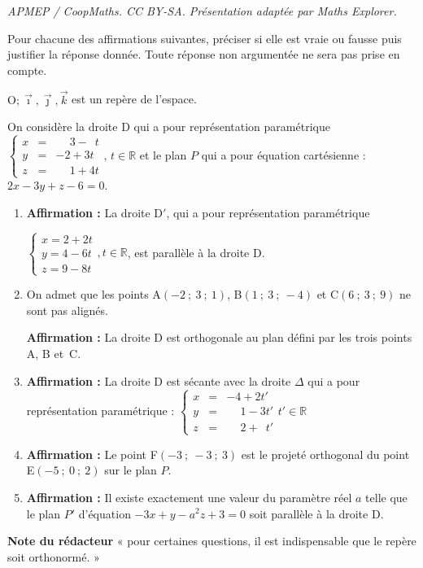 \documentclass[10pt]{article}
\providecommand{\R}{\mathbb{R}}
\providecommand{\Oijk}{\(\mathrm{O};\vec{\imath},\vec{\jmath},\vec{k}\)}
\begin{document}
\noindent\textit{APMEP / CoopMaths. CC BY-SA. Présentation adaptée par Maths Explorer.}\par\medskip
\medskip

Pour chacune des affirmations suivantes, préciser si elle est vraie ou fausse puis justifier la réponse donnée. Toute réponse non argumentée ne sera pas prise en compte.

\bigskip
\Oijk{} est un repère de l'espace.

On considère la droite D qui a pour représentation paramétrique $\left\{\begin{array}{lcl}x&=&\phantom{-}3 - \phantom{3}t \\ y&=&-2 + 3t \\ z&=&\phantom{-}1 + 4t\end{array},\, t \in \R\right.$ et le plan $P$ qui a pour équation cartésienne : $2x -3y + z - 6 = 0$.

\medskip

\begin{enumerate}
\item \textbf{Affirmation :} 
La droite $\mathrm{D}'$, qui a pour représentation paramétrique 

$\left\{\begin{array}{l}x=2+2 t \\ y=4-6 t \\ z=9-8 t\end{array}, t \in \R\right.$, est parallèle à la droite D.

\item On admet que les points A$(-2 ~;~ 3 ~;~ 1)$, B$(1~;~ 3 ~;~-4)$ et C$(6 ~;~ 3 ~;~ 9)$ ne sont pas alignés.

\textbf{Affirmation :} La droite D est orthogonale au plan défini par les trois points A, B et~C.

\item \textbf{Affirmation :} La droite D est sécante avec la droite $\Delta$ qui a pour représentation paramétrique : $\left\{\begin{array}{lcl}x&=&-4+2 t' \\ y&=&\phantom{-}1-3 t' \\ z&=&\phantom{-}2+\phantom{2}t'\end{array} t' \in \R\right.$

\item \textbf{Affirmation :} Le point F$(-3~;~-3~;~3)$ est le projeté orthogonal du point E$(-5~;~0~;~2)$ sur le plan $P$.

\item \textbf{Affirmation :} Il existe exactement une valeur du paramètre réel $a$ telle que le plan $P'$ d'équation $-3x + y - a^{2} z+3=0$ soit parallèle à la droite D.
\end{enumerate}

\smallskip

\textbf{Note du rédacteur} «  pour certaines questions, il est indispensable que le repère soit orthonormé. »

\bigskip
\end{document}
